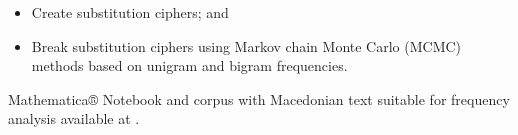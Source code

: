 \documentclass[11pt,letterpaper]{article}%
\begin{document}
\begin{minipage}[t]{.4\textwidth}
\begin{description}
    \begin{itemize}%
      [%
      nosep,leftmargin=*,%
      before=\leavevmode\vspace*{-\dimexpr2\topsep+\baselineskip\relax}%
      ]
    \item Create substitution ciphers; and
    \item Break substitution ciphers using Markov chain Monte Carlo (MCMC)
      methods based on unigram and bigram frequencies.
    \end{itemize}
    Mathematica® Notebook and corpus with Macedonian text suitable for frequency
    analysis available at .
  \end{description}
\end{minipage}
\end{document}
